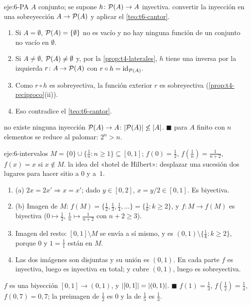 \begin{solucion}{eje:6-PA}
\datos $A$ conjunto; se supone $h\colon\mathcal{P}(A)\to A$ inyectiva.
\planteamiento convertir la inyección en una sobreyección $A\to\mathcal{P}(A)$ y aplicar el \cref{teo:t6-cantor}.
\pasos
\begin{enumerate}[label=\arabic*.]
  \item Si $A=\emptyset$, $\mathcal{P}(A)=\{\emptyset\}$ no es vacío y no hay ninguna función de un conjunto no vacío en $\emptyset$.
  \item Si $A\neq\emptyset$, $\mathcal{P}(A)\neq\emptyset$ y, por la \cref{prop:t4-laterales}, $h$ tiene una inversa por la izquierda $r\colon A\to\mathcal{P}(A)$ con $r\circ h=\mathrm{id}_{\mathcal{P}(A)}$.
  \item Como $r\circ h$ es sobreyectiva, la función exterior $r$ es sobreyectiva (\cref{prop:t4-reciproco}(ii)).
  \item Eso contradice el \cref{teo:t6-cantor}.
\end{enumerate}
\resultado no existe ninguna inyección $\mathcal{P}(A)\to A$: $\lvert\mathcal{P}(A)\rvert\not\le\lvert A\rvert$. \hfill$\blacksquare$
\comprobacion para $A$ finito con $n$ elementos se reduce al palomar: $2^{n}>n$.
\end{solucion}

\begin{solucion}{eje:6-intervalos}
\datos $M=\{0\}\cup\{\tfrac1n: n\ge1\}\subseteq[0,1]$; $f(0)=\tfrac12$, $f(\tfrac1n)=\tfrac1{n+2}$, $f(x)=x$ si $x\notin M$.
\planteamiento la idea del «hotel de Hilbert»: desplazar una sucesión dos lugares para hacer sitio a $0$ y a~$1$.
\pasos
\begin{enumerate}[label=\arabic*.]
  \item (a) $2x=2x'\Rightarrow x=x'$; dado $y\in[0,2]$, $x=y/2\in[0,1]$. Es biyectiva.
  \item (b) Imagen de $M$: $f(M)=\{\tfrac12,\tfrac13,\tfrac14,\dots\}=\{\tfrac1k: k\ge2\}$, y $f\colon M\to f(M)$ es biyectiva ($0\mapsto\tfrac12$, $\tfrac1n\mapsto\tfrac1{n+2}$ con $n+2\ge3$).
  \item Imagen del resto: $[0,1]\setminus M$ se envía a sí mismo, y es $(0,1)\setminus\{\tfrac1k:k\ge2\}$, porque $0$ y $1=\tfrac11$ están en $M$.
  \item Las dos imágenes son disjuntas y su unión es $(0,1)$. En cada parte $f$ es inyectiva, luego es inyectiva en total; y cubre $(0,1)$, luego es sobreyectiva.
\end{enumerate}
\resultado $f$ es una biyección $[0,1]\to(0,1)$, y $\lvert[0,1]\rvert=\lvert(0,1)\rvert$. \hfill$\blacksquare$
\comprobacion $f(1)=\tfrac13$, $f(\tfrac12)=\tfrac14$, $f(0{,}7)=0{,}7$; la preimagen de $\tfrac12$ es $0$ y la de $\tfrac15$ es $\tfrac13$.
\end{solucion}
